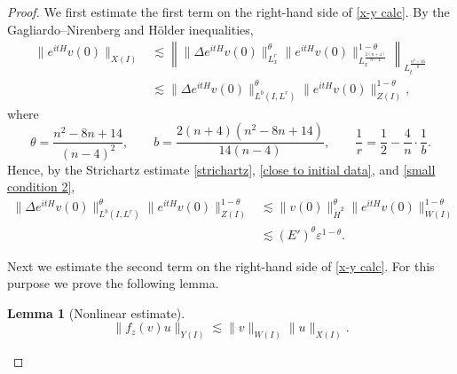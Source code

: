 \documentclass[11pt,a4paper]{article}
\numberwithin{equation}{section}
\newtheorem{lemma}[theorem]{Lemma}
\begin{document}
\begin{proof}
We first estimate the first term on the right-hand side of \eqref{x-y calc}. By the Gagliardo--Nirenberg and H\"older inequalities,
\begin{align*}
\|e^{itH}v(0)\|_{X(I)}
&\lesssim \left\| \|\Delta e^{itH}v(0)\|_{L^{r}_{x}}^{\theta} \|e^{itH}v(0)\|_{L^{\frac{2(n+4)}{n-4}}_{x}}^{1 - \theta} \right\|_{L^{\frac{n^{2} - 16}{8}}_{t}} \\
&\lesssim \|\Delta e^{itH}v(0) \|_{L^{b}(I, L^{r})}^{\theta} \|e^{itH}v(0)\|_{Z(I)}^{1 - \theta},
\end{align*}
where
\[
\theta = \dfrac{n^{2} -8n +14}{(n - 4)^{2}},\qquad
b = \dfrac{2(n + 4)(n^{2} - 8n + 14)}{14(n - 4)},\qquad
\dfrac{1}{r} = \dfrac{1}{2} - \dfrac{4}{n}\cdot\dfrac{1}{b}.
\]
Hence, by the Strichartz estimate \eqref{strichartz}, \eqref{close to initial data}, and \eqref{small condition 2},
\begin{equation}\label{stablity:1st}
\begin{aligned}
\|\Delta e^{itH}v(0) \|_{L^{b}(I, L^{r})}^{\theta} \|e^{itH}v(0)\|_{Z(I)}^{1 - \theta}
&\lesssim \|v(0)\|_{\dot{H}^{2}}^{\theta}\|e^{itH}v(0)\|_{W(I)}^{1 - \theta} \\
&\lesssim (E')^{\theta}\varepsilon^{1 - \theta}.
\end{aligned}
\end{equation}

Next we estimate the second term on the right-hand side of \eqref{x-y calc}. For this purpose we prove the following lemma.

\begin{lemma}[Nonlinear estimate]
\begin{equation}\label{nonliner estimate}
\|f_{z}(v)u\|_{Y(I)} \lesssim \|v\|_{W(I)}\|u\|_{X(I)}.
\end{equation}
\end{lemma}


\end{proof}
\end{document}
